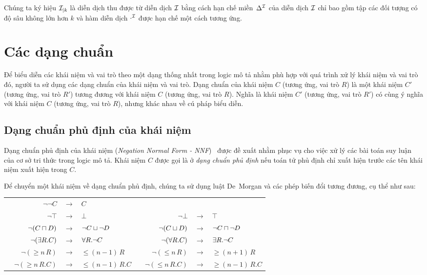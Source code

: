 Chúng ta ký hiệu $\mathcal{I}_{\mid k}$ là diễn dịch thu được từ diễn dịch $\mathcal{I}$ bằng cách hạn chế miền~$\Delta^{\mathcal{I}}$ của diễn dịch $\mathcal{I}$ chỉ bao gồm tập các đối tượng có độ sâu không lớn hơn $k$ và hàm diễn dịch $\cdot^{\mathcal{I}}$ được hạn chế một cách tương ứng.
\section{Các dạng chuẩn}
\label{sec:Chap1.NormalForms}

Để biểu diễn các khái niệm và vai trò theo một dạng thống nhất trong logic mô tả nhằm phù hợp với quá trình xử lý khái niệm và vai trò đó, người ta sử dụng các dạng chuẩn của khái niệm và vai trò. Dạng chuẩn của khái niệm $C$ (tương ứng, vai trò $R$) là một khái niệm $C'$ (tương ứng, vai trò $R'$) tương đương với khái niệm $C$ (tương ứng, vai trò $R$). Nghĩa là khái niệm $C'$ (tương ứng, vai trò $R'$) có cùng ý nghĩa với khái niệm $C$ (tương ứng, vai trò $R$), nhưng khác nhau về cú pháp biểu diễn.

\subsection{Dạng chuẩn phủ định của khái niệm}
\label{sec:Chap1.NegationNormalForm}
Dạng chuẩn phủ định của khái niệm ({\em Negation Normal Form - NNF})~\cite{DLHandbook2007,Lehmann2006} được đề xuất nhằm phục vụ cho việc xử lý các bài toán suy luận của cơ sở tri thức trong logic mô tả. 
Khái niệm $C$ được gọi là ở {\em dạng chuẩn phủ định} nếu toán tử phủ định chỉ xuất hiện trước các tên khái niệm xuất hiện trong $C$.

Để chuyển một khái niệm về dạng chuẩn phủ định, chúng ta sử dụng luật De~Morgan và các phép biến đổi tương đương, cụ thể như sau:\\[1.0ex]
\begin{tabular}{c r c l c r c l}
	& $\neg \neg C$ & $\longrightarrow$ & $C$\\[0.5ex]
	& $\neg \top$ & $\longrightarrow$ & $\bot$ & & $\neg \bot$ & $\longrightarrow$ & $\top$\\[0.5ex]
	& $\neg (C \sqcap D)$ & $\longrightarrow$ & $\neg C \sqcup \neg D$ & & $\neg (C \sqcup D)$ & $\longrightarrow$ & $\neg C \sqcap \neg D$\\[0.5ex]
	& $\neg (\exists R.C)$ & $\longrightarrow$ & $\forall R.\neg C$ & & $\neg (\forall R.C)$ & $\longrightarrow$ & $\exists R.\neg C$\\[0.5ex]
	& $\neg (\geq\!n\,R)$ & $\longrightarrow$ & $\leq\!(n-1)\,R$ & & $\neg (\leq\!n\,R)$ & $\longrightarrow$ & $\geq\!(n+1)\,R$\\[0.5ex]
	& $\neg (\geq\!n\,R.C)$ & $\longrightarrow$ & $\leq\!(n-1)\,R.C$ &\qquad\qquad\qquad & $\neg (\leq\!n\,R.C)$ & $\longrightarrow$ & $\geq\!(n-1)\,R.C$\\[0.5ex]
\end{tabular}

